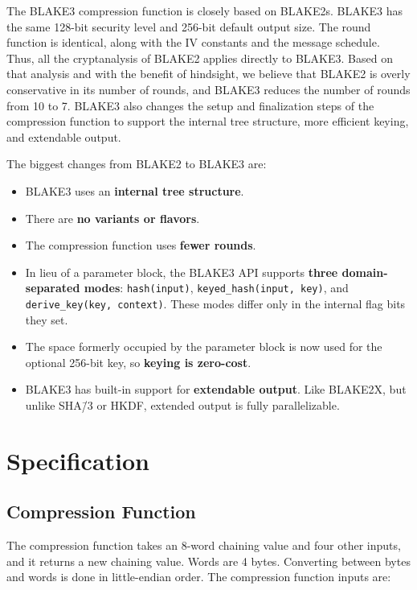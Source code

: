 \documentclass[11pt,notitlepage,a4paper]{article}
\begin{document}
The BLAKE3 compression function is closely based on BLAKE2s. BLAKE3 has the
same 128-bit security level and 256-bit default output size. The round function
is identical, along with the IV constants and the message schedule. Thus, all
the cryptanalysis of BLAKE2 applies directly to BLAKE3. Based on that analysis
and with the benefit of hindsight, we believe that BLAKE2 is overly
conservative in its number of rounds, and BLAKE3 reduces the number of rounds
from 10 to 7. BLAKE3 also changes the setup and finalization steps of the
compression function to support the internal tree structure, more efficient
keying, and extendable output.

The biggest changes from BLAKE2 to BLAKE3 are:

\begin{itemize}
    \item BLAKE3 uses an \textbf{internal tree structure}.
    \item There are \textbf{no variants or flavors}.
    \item The compression function uses \textbf{fewer rounds}.
    \item In lieu of a parameter block, the BLAKE3 API supports \textbf{three
        domain-separated modes}: \texttt{hash(input)},
        \texttt{keyed\_hash(input, key)}, and \texttt{derive\_key(key,
        context)}. These modes differ only in the internal flag bits they set.
    \item The space formerly occupied by the parameter block is now used for
        the optional 256-bit key, so \textbf{keying is zero-cost}.
    \item BLAKE3 has built-in support for \textbf{extendable output}. Like
        BLAKE2X, but unlike SHA\=/3 or HKDF, extended output is fully
        parallelizable.
\end{itemize}

\nocite{DBLP:journals/iacr/AumassonNWW13,DBLP:journals/rfc/rfc7693,DBLP:journals/tosc/LuykxMN16}

\section{Specification}\label{sec:specification}

\subsection{Compression Function}\label{sec:compression}

The compression function takes an 8-word chaining value and four other inputs,
and it returns a new chaining value. Words are 4 bytes. Converting between
bytes and words is done in little-endian order. The compression function inputs
are:
\end{document}
